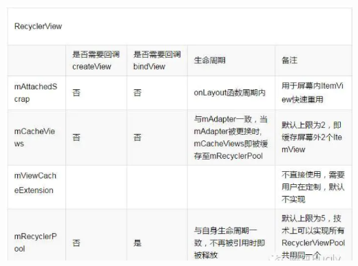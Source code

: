 \documentclass[9pt, b5paper]{article}
\begin{document}
\includegraphics[width=.9\linewidth]{./pic/cache.png}
\end{document}
